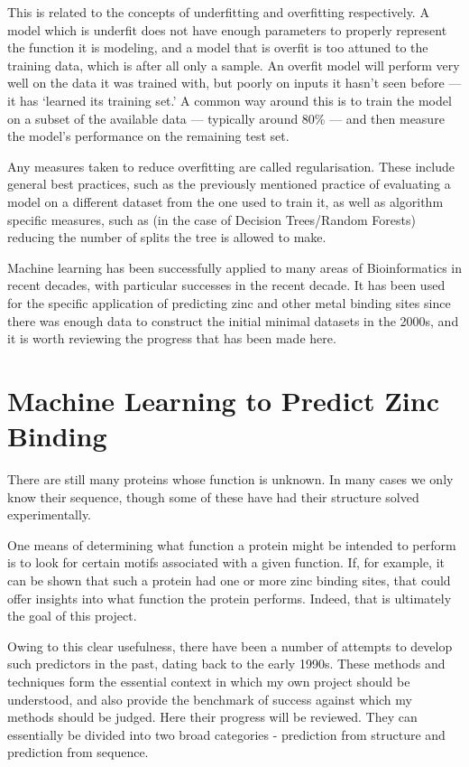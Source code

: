 This is related to the concepts of underfitting and overfitting respectively. A model which is underfit does not have enough parameters to properly represent the function it is modeling, and a model that is overfit is too attuned to the training data, which is after all only a sample. An overfit model will perform very well on the data it was trained with, but poorly on inputs it hasn't seen before --- it has `learned its training set.' A common way around this is to train the model on a subset of the available data --- typically around 80\% --- and then measure the model's performance on the remaining test set. 

Any measures taken to reduce overfitting are called regularisation. These include general best practices, such as the previously mentioned practice of evaluating a model on a different dataset from the one used to train it, as well as algorithm specific measures, such as (in the case of Decision Trees/Random Forests) reducing the number of splits the tree is allowed to make.

Machine learning has been successfully applied to many areas of Bioinformatics in recent decades, with particular successes in the recent decade. It has been used for the specific application of predicting zinc and other metal binding sites since there was enough data to construct the initial minimal datasets in the 2000s, and it is worth reviewing the progress that has been made here.

\section{Machine Learning to Predict Zinc Binding}

There are still many proteins whose function is unknown. In many cases we only know their sequence, though some of these have had their structure solved experimentally.

One means of determining what function a protein might be intended to perform is to look for certain motifs associated with a given function. If, for example, it can be shown that such a protein had one or more zinc binding sites, that could offer insights into what function the protein performs. Indeed, that is ultimately the goal of this project.

Owing to this clear usefulness, there have been a number of attempts to develop such predictors in the past, dating back to the early 1990s. These methods and techniques form the essential context in which my own project should be understood, and also provide the benchmark of success against which my methods should be judged. Here their progress will be reviewed. They can essentially be divided into two broad categories - prediction from structure and prediction from sequence.

